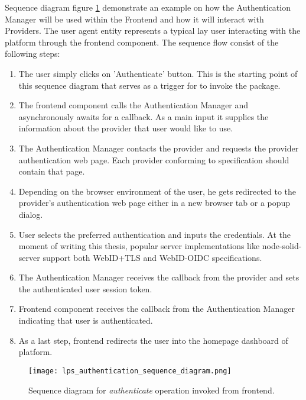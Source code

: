  Sequence diagram  figure \ref{fig:lps_authentication_sequence_diagram} demonstrate an example on how the Authentication Manager will be used within the \lpa{} Frontend and how it will interact with \solid{} Providers. The user agent entity represents a typical lay \lpa{} user interacting with the platform through the frontend component. The sequence flow consist of the following steps:

\begin{enumerate}
    \item The user simply clicks on  'Authenticate' button. This is the starting point of this sequence diagram that serves as a trigger for \lpa{} to invoke the \lpa{} package.
    \item The frontend component calls the Authentication Manager and asynchronously  awaits for a callback. As a main input it supplies the information about the \solid{} provider that user would like to use.
    \item The Authentication Manager contacts the \solid{} provider and requests the provider authentication web page. Each provider conforming to \solid{} specification should contain that page.
    \item Depending on the browser environment of the user, he gets redirected to the provider's authentication web page either in a new browser tab or a popup dialog.
    \item User selects the preferred authentication and inputs the credentials. At the moment of writing this thesis, popular \solid{} server implementations like node-solid-server support both WebID+TLS and WebID-OIDC specifications.
    \item The Authentication Manager receives the callback from the provider and sets the authenticated user session token.
    \item Frontend component receives the callback from the Authentication Manager indicating that user is authenticated.
    \item As a last step, frontend redirects the user into the homepage dashboard of \lpa{} platform.
\end{enumerate}


\begin{figure}[h]
\centering
\texttt{[image: lps\_authentication\_sequence\_diagram.png]}
\caption{Sequence diagram for \textit{authenticate} operation invoked from \lpa{} frontend.}
\label{fig:lps_authentication_sequence_diagram}
\end{figure}


